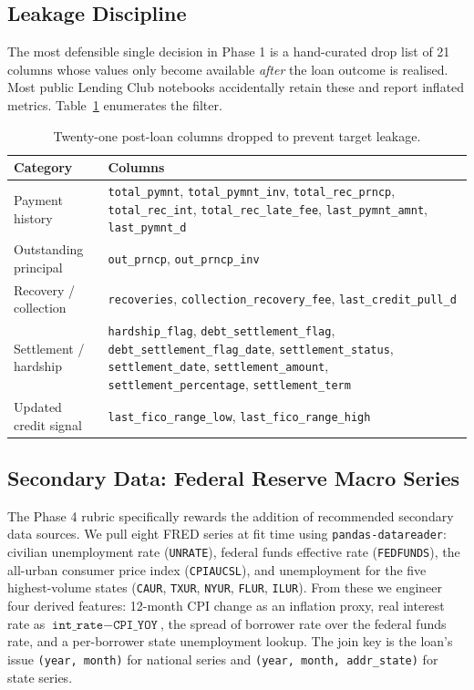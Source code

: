 \documentclass[conference]{IEEEtran}
\begin{document}
\subsection{Leakage Discipline}

The most defensible single decision in Phase 1 is a hand-curated drop list
of 21 columns whose values only become available \emph{after} the loan
outcome is realised. Most public Lending Club notebooks accidentally retain
these and report inflated metrics. Table~\ref{tab:leakage} enumerates the
filter.

\begin{table}[t]
\caption{Twenty-one post-loan columns dropped to prevent target leakage.}
\label{tab:leakage}
\centering
\renewcommand{\arraystretch}{1.15}
\begin{tabular}{p{} p{}}
\toprule
\textbf{Category} & \textbf{Columns} \\
\midrule
Payment history &
\texttt{total\_pymnt}, \texttt{total\_pymnt\_inv},
\texttt{total\_rec\_prncp}, \texttt{total\_rec\_int},
\texttt{total\_rec\_late\_fee},
\texttt{last\_pymnt\_amnt}, \texttt{last\_pymnt\_d} \\
Outstanding principal &
\texttt{out\_prncp}, \texttt{out\_prncp\_inv} \\
Recovery / collection &
\texttt{recoveries}, \texttt{collection\_recovery\_fee},
\texttt{last\_credit\_pull\_d} \\
Settlement / hardship &
\texttt{hardship\_flag}, \texttt{debt\_settlement\_flag},
\texttt{debt\_settlement\_flag\_date},
\texttt{settlement\_status},
\texttt{settlement\_date},
\texttt{settlement\_amount},
\texttt{settlement\_percentage},
\texttt{settlement\_term} \\
Updated credit signal &
\texttt{last\_fico\_range\_low}, \texttt{last\_fico\_range\_high} \\
\bottomrule
\end{tabular}
\end{table}

\subsection{Secondary Data: Federal Reserve Macro Series}

The Phase 4 rubric specifically rewards the addition of recommended
secondary data sources. We pull eight FRED series at fit time using
\texttt{pandas-datareader}: civilian unemployment rate (\texttt{UNRATE}),
federal funds effective rate (\texttt{FEDFUNDS}), the all-urban consumer
price index (\texttt{CPIAUCSL}), and unemployment for the five highest-volume
states (\texttt{CAUR}, \texttt{TXUR}, \texttt{NYUR}, \texttt{FLUR},
\texttt{ILUR}). From these we engineer four derived features: 12-month CPI
change as an inflation proxy, real interest rate as
$\texttt{int\_rate} - \texttt{CPI\_YOY}$, the spread of borrower rate over
the federal funds rate, and a per-borrower state unemployment lookup. The
join key is the loan's issue \texttt{(year, month)} for national series and
\texttt{(year, month, addr\_state)} for state series.
\end{document}
